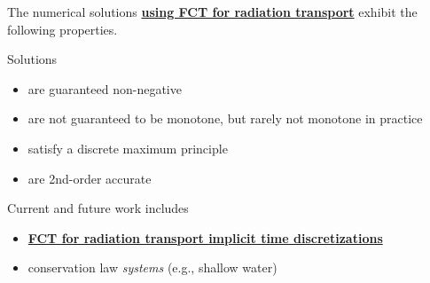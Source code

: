 The numerical solutions \underline{\bf using FCT for radiation transport} exhibit the following properties. 

Solutions 
\begin{itemize}
  \item are guaranteed non-negative
  \item are not guaranteed to be monotone, but rarely not monotone in practice
  \item satisfy a discrete maximum principle
  \item are 2nd-order accurate
\end{itemize}

\bigskip

Current and future work includes
\begin{itemize}
  \item \underline{\bf FCT for radiation transport implicit time discretizations}
  \item conservation law \emph{systems} (e.g., shallow water)
\end{itemize}

